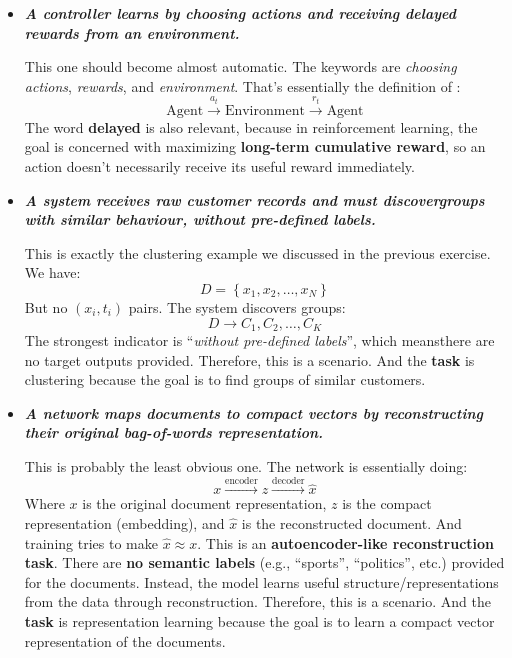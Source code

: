 \begin{itemize}
    \item[\textbf{RL.}] \textcolor{Green3}{\textbf{\emph{A controller learns by choosing actions and receiving delayed rewards from an environment.}}}

        This one should become almost automatic. The keywords are \emph{choosing actions}, \emph{rewards}, and \emph{environment}. That's essentially the definition of :
        \begin{equation*}
            \text{Agent} \xrightarrow{a_t} \text{Environment} \xrightarrow{r_t} \text{Agent}
        \end{equation*}
        The word \textbf{delayed} is also relevant, because in reinforcement learning, the goal is concerned with maximizing \textbf{long-term cumulative reward}, so an action doesn't necessarily receive its useful reward immediately.

    \item[\textbf{U.}] \textcolor{Green3}{\textbf{\emph{A system receives raw customer records and must discover\break groups with similar behaviour, without pre-defined labels.}}}

        This is exactly the clustering example we discussed in the previous exercise. We have:
        \begin{equation*}
            D = \left\{x_1, x_2, \ldots, x_N\right\}
        \end{equation*}
        But no $\left(x_i, t_i\right)$ pairs. The system discovers groups:
        \begin{equation*}
            D \to C_{1}, C_{2}, \ldots, C_{K}
        \end{equation*}
        The strongest indicator is ``\emph{without pre-defined labels}'', which means\break there are no target outputs provided. Therefore, this is a  scenario. And the \textbf{task} is clustering because the goal is to find groups of similar customers.

    \item[\textbf{U.}] \textcolor{Green3}{\textbf{\emph{A network maps documents to compact vectors by reconstructing their original bag-of-words representation.}}}

        This is probably the least obvious one. The network is essentially doing:
        \begin{equation*}
            x \xrightarrow{\text{encoder}} z \xrightarrow{\text{decoder}} \hat{x}
        \end{equation*}
        Where $x$ is the original document representation, $z$ is the compact representation (embedding), and $\hat{x}$ is the reconstructed document. And training tries to make $\hat{x} \approx x$. This is an \textbf{autoencoder-like reconstruction task}. There are \textbf{no semantic labels} (e.g., ``sports'', ``politics'', etc.) provided for the documents. Instead, the model learns useful structure/representations from the data through reconstruction. Therefore, this is a  scenario. And the \textbf{task} is representation learning because the goal is to learn a compact vector representation of the documents.
\end{itemize}

